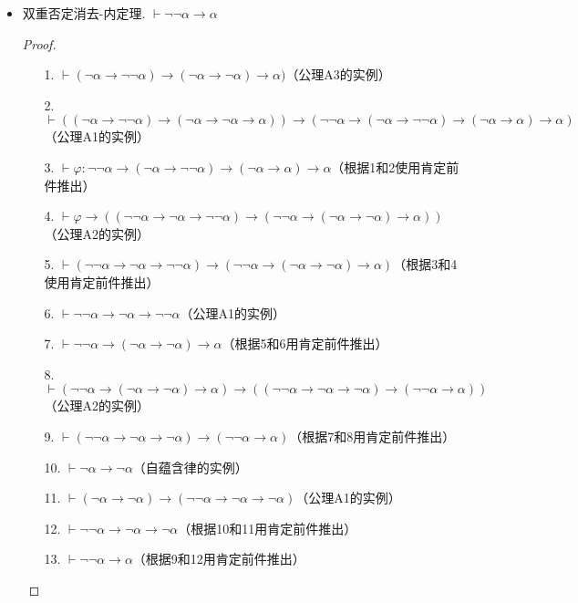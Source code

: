 \documentclass[main.tex]{subfiles}
\begin{document}
\begin{itemize}
    \item 双重否定消去-内定理. \(\vdash \neg \neg \alpha \to \alpha\)
    \begin{proof}
        \begin{itemize}
            \item [1.] \(\vdash (\neg \alpha \to \neg \neg \alpha) \to (\neg \alpha \to \neg \alpha) \to \alpha)\)（公理A3的实例）
            \item [2.] \(\vdash ((\neg \alpha \to \neg \neg \alpha) \to (\neg \alpha \to \neg \alpha \to \alpha)) \to (\neg \neg \alpha \to (\neg \alpha \to \neg \neg \alpha) \to (\neg \alpha \to \alpha) \to \alpha)\)（公理A1的实例）
            \item [3.] \(\vdash \varphi: \neg \neg \alpha \to (\neg \alpha \to \neg \neg \alpha) \to (\neg \alpha \to \alpha) \to \alpha\)（根据1和2使用肯定前件推出）
            \item [4.] \(\vdash \varphi \to ((\neg \neg \alpha \to \neg \alpha \to \neg \neg \alpha) \to (\neg \neg \alpha \to (\neg \alpha \to \neg \alpha) \to \alpha))\)（公理A2的实例）
            \item [5.] \(\vdash (\neg \neg \alpha \to \neg \alpha \to \neg \neg \alpha) \to (\neg \neg \alpha \to (\neg \alpha \to \neg \alpha) \to \alpha)\)（根据3和4使用肯定前件推出）
            \item [6.] \(\vdash \neg \neg \alpha \to \neg \alpha \to \neg \neg \alpha\)（公理A1的实例）
            \item [7.] \(\vdash \neg \neg \alpha \to (\neg \alpha \to \neg \alpha) \to \alpha\)（根据5和6用肯定前件推出）
            \item [8.] \(\vdash (\neg \neg \alpha \to (\neg \alpha \to \neg \alpha) \to \alpha) \to ((\neg \neg \alpha \to \neg \alpha \to \neg \alpha) \to (\neg \neg \alpha \to \alpha))\)（公理A2的实例）
            \item [9.] \(\vdash (\neg \neg \alpha \to \neg \alpha \to \neg \alpha) \to (\neg \neg \alpha \to \alpha)\)（根据7和8用肯定前件推出）
            \item [10.] \(\vdash \neg \alpha \to \neg \alpha\)（自蕴含律的实例）
            \item [11.] \(\vdash (\neg \alpha \to \neg \alpha) \to (\neg \neg \alpha \to \neg \alpha \to \neg \alpha)\)（公理A1的实例）
            \item [12.] \(\vdash \neg \neg \alpha \to \neg \alpha \to \neg \alpha\)（根据10和11用肯定前件推出）
            \item [13.] \(\vdash \neg \neg \alpha \to \alpha\)（根据9和12用肯定前件推出）
         \end{itemize}
    \end{proof}


\end{itemize}
\end{document}
